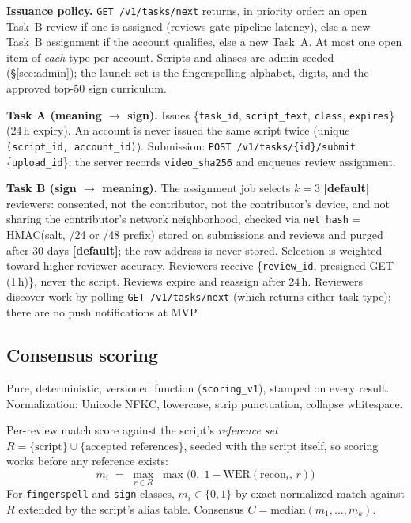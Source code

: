 \documentclass[11pt]{article}
\newcommand{\code}[1]{\texttt{#1}}
\begin{document}
\textbf{Issuance policy.} \code{GET /v1/tasks/next} returns, in priority order: an
open Task~B review if one is assigned (reviews gate pipeline latency), else a new
Task~B assignment if the account qualifies, else a new Task~A. At most one open
item of \emph{each} type per account. Scripts and aliases are admin-seeded
(\S\ref{sec:admin}); the launch set is the fingerspelling alphabet, digits, and
the approved top-50 sign curriculum.

\textbf{Task A (meaning $\to$ sign).} Issues \{\code{task\_id},
\code{script\_text}, \code{class}, \code{expires}\} (24\,h expiry).
An account is never issued the same script twice (unique
\code{(script\_id, account\_id)}). Submission:
\code{POST /v1/tasks/\{id\}/submit} \{\code{upload\_id}\}; the server records
\code{video\_sha256} and enqueues review assignment.

\textbf{Task B (sign $\to$ meaning).} The assignment job selects $k=3$
\textbf{[default]} reviewers: consented, not the contributor, not the contributor's
device, and not sharing the contributor's network neighborhood, checked via
\code{net\_hash} = HMAC(salt, /24 or /48 prefix) stored on submissions and reviews
and purged after 30 days \textbf{[default]}; the raw address is never stored.
Selection is weighted toward higher reviewer accuracy. Reviewers receive
\{\code{review\_id}, presigned GET (1\,h)\}, never the script. Reviews expire
and reassign after 24\,h. Reviewers discover work by polling \code{GET
/v1/tasks/next} (which returns either task type); there are no push notifications
at MVP.

\subsection{Consensus scoring}
\label{sec:consensus}

Pure, deterministic, versioned function (\code{scoring\_v1}), stamped on every
result. Normalization: Unicode NFKC, lowercase, strip punctuation, collapse
whitespace.

Per-review match score against the script's \emph{reference set}
$R = \{\text{script}\} \cup \{\text{accepted references}\}$, seeded with the
script itself, so scoring works before any reference exists:
\[
m_i \;=\; \max_{r \in R} \; \max\!\bigl(0,\; 1 - \mathrm{WER}(\text{recon}_i,\, r)\bigr)
\]
For \code{fingerspell} and \code{sign} classes, $m_i \in \{0,1\}$ by exact
normalized match against $R$ extended by the script's alias table. Consensus
$C = \mathrm{median}(m_1, \ldots, m_k)$.
\end{document}
